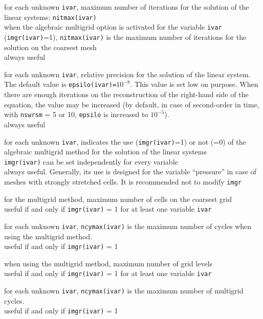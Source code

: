 {for each unknown {\tt ivar}, maximum number of iterations for the solution of
the linear systems: {\tt nitmax(ivar)}\\
when the algebraic multigrid option is activated for the variable {\tt ivar}
({\tt imgr(ivar)}=1), {\tt nitmax(ivar)} is the maximum number of iterations
for the solution on the coarsest mesh\\
always useful}

{for each unknown {\tt ivar}, relative precision for the solution of the linear
system. The default value is {\tt epsilo(ivar)=$10^{-8}$}. This value is set low
on purpose. When there are enough iterations on the reconstruction of the
right-hand side of the equation,
the value may be increased (by default, in case of second-order in time,
with {\tt nswrsm} = 5 or 10, {\tt epsilo} is increased to $10^{-5}$).\\
always useful}

{for each unknown {\tt ivar}, indicates the use ({\tt imgr(ivar)}=1) or not
(=0) of the algebraic multigrid method for the solution of the linear systems\\
{\tt imgr(ivar)} can be set independently for every variable\\
always useful. Generally, its use is designed for the variable ``pressure'' in
case of meshes with strongly stretched cells. It is recommended not to modify
{\tt imgr}}

{for the multigrid method, maximum number of cells on the coarsest grid\\
useful if and only if {\tt imgr(ivar)} = 1 for at least one variable {\tt ivar}}

{for each unknown {\tt ivar}, {\tt ncymax(ivar)} is the maximum number of
cycles when using the multigrid method.\\
useful if and only if {\tt imgr(ivar)} = 1}

{when using the multigrid method, maximum number of grid levels\\
useful if and only if {\tt imgr(ivar)} = 1 for at least one variable {\tt ivar}}

{for each unknown {\tt ivar}, {\tt ncymax(ivar)} is the maximum number of
 multigrid cycles.\\
useful if and only if {\tt imgr(ivar)} = 1}

